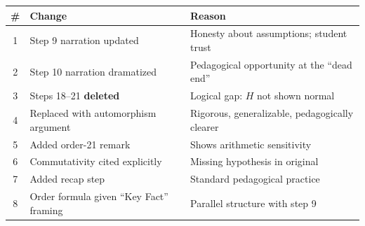 \documentclass[11pt]{article}
\begin{document}
\begin{table}[h]
\centering
\begin{tabular}{@{}clp{7.5cm}@{}}
\toprule
\# & Change & Reason \\
\midrule
1 & Step 9 narration updated & Honesty about assumptions; student trust \\
2 & Step 10 narration dramatized & Pedagogical opportunity at the ``dead end'' \\
3 & Steps 18--21 \textbf{deleted} & Logical gap: $H$ not shown normal \\
4 & Replaced with automorphism argument & Rigorous, generalizable, pedagogically clearer \\
5 & Added order-21 remark & Shows arithmetic sensitivity \\
6 & Commutativity cited explicitly & Missing hypothesis in original \\
7 & Added recap step & Standard pedagogical practice \\
8 & Order formula given ``Key Fact'' framing & Parallel structure with step 9 \\
\bottomrule
\end{tabular}
\end{table}
\end{document}
